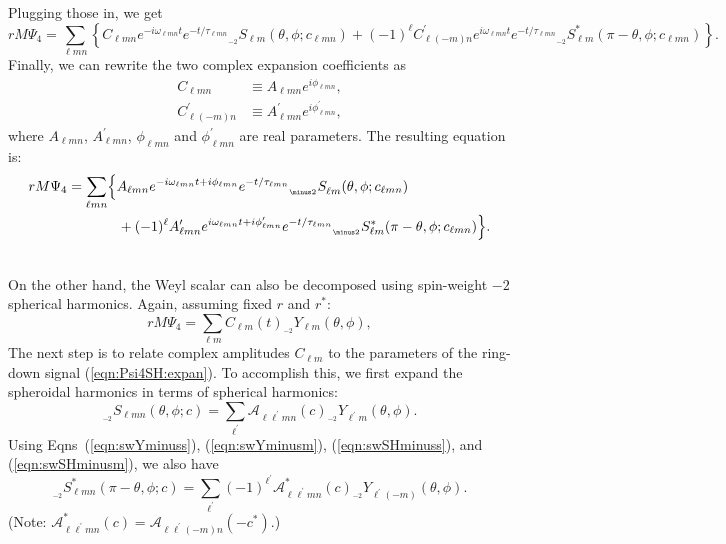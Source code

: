 \documentclass[11pt]{article}
\newcommand{\swY}[4][]{{}_{{}_{#2}}\!Y^{#1}_{#3}(#4)}
\newcommand{\swSH}[5][]{{}_{{}_{#2}}S^{#1}_{#3}(#4;#5)}
\begin{document}
\noindent
Plugging those in, we get
\begin{equation}
\nonumber rM\Psi_4 = \sum_{\ell{m}n} \left\{C_{\ell{m}n} e^{-i\omega_{\ell{m}n}t}e^{-t/\tau_{\ell{m}n}} \swSH{\minus 2}{\ell{m}}{\theta,\phi}{c_{\ell{m}n}}
  + (-1)^\ell C^\prime_{\ell(-m)n} e^{i\omega_{\ell{m}n}t}e^{-t/\tau_{\ell{m}n}} \swSH[*]{\minus 2}{\ell{m}}{\pi-\theta,\phi}{c_{\ell{m}n}} \right\}.
\end{equation}
Finally, we can rewrite the two complex expansion coefficients as
\begin{align}
  C_{\ell{m}n} &\equiv A_{\ell{m}n}e^{i\phi_{\ell{m}n}}, \\
  C^\prime_{\ell(-m)n} &\equiv A^\prime_{\ell{m}n}e^{i\phi^\prime_{\ell{m}n}},
\end{align}
where $A_{\ell{m}n}$, $A^\prime_{\ell{m}n}$, $\phi_{\ell{m}n}$ and $\phi^\prime_{\ell{m}n}$ are real parameters.  The resulting equation is:
\begin{align} \label{eqn:Psi4SH:expan}
\nonumber rM\Psi_4 &= \sum_{\ell{m}n} \Bigl\{A_{\ell{m}n} e^{-i\omega_{\ell{m}n}t+i\phi_{\ell{m}n}}e^{-t/\tau_{\ell{m}n}} \swSH{\minus 2}{\ell{m}}{\theta,\phi}{c_{\ell{m}n}} \nonumber\\ & {} \hspace{0.5in}
  + (-1)^\ell A^\prime_{\ell{m}n} e^{i\omega_{\ell{m}n}t+i\phi^\prime_{\ell{m}n}}e^{-t/\tau_{\ell{m}n}} \swSH[*]{\minus 2}{\ell{m}}{\pi-\theta,\phi}{c_{\ell{m}n}} \Bigr\}.
\end{align}

\noindent\\
On the other hand, the Weyl scalar can also be decomposed using spin-weight $\minus 2$ spherical harmonics.  Again, assuming fixed $r$ and $r^*$:
\begin{equation}\label{eqn:Psi4Y:expan}
rM\Psi_4 = \sum_{\ell{m}} C_{\ell{m}}(t) \swY{\minus 2}{\ell{m}}{\theta,\phi},
\end{equation} 
The next step is to relate complex amplitudes $C_{\ell{m}}$ to the parameters of the ring-down signal (\ref{eqn:Psi4SH:expan}).  To accomplish this, we first expand the spheroidal harmonics in terms of spherical harmonics:
\begin{equation} \label{eqn:swSH:expan}
\swSH{\minus 2}{\ell{m}n}{\theta,\phi}{c} = \sum_{\ell^\prime} \mathcal{A}_{\ell\ell^\prime{m}n}(c) \swY{\minus 2}{\ell^\prime{m}}{\theta,\phi}.
\end{equation}
Using Eqns~(\ref{eqn:swYminuss}), (\ref{eqn:swYminusm}), (\ref{eqn:swSHminuss}), and (\ref{eqn:swSHminusm}), we also have
\begin{equation} \label{eqn:swSconj:expan}
\swSH[*]{\minus 2}{\ell{m}n}{\pi-\theta,\phi}{c} = \sum_{\ell^\prime} (-1)^{\ell^\prime}\mathcal{A}^{*}_{\ell\ell^\prime{m}n}(c) \swY{\minus 2}{\ell^\prime(-m)}{\theta,\phi}.
\end{equation}
(Note: $\mathcal{A}^{*}_{\ell\ell^\prime{m}n}(c) = \mathcal{A}_{\ell\ell^\prime(-m)n}(-c^*)$.)
\end{document}

